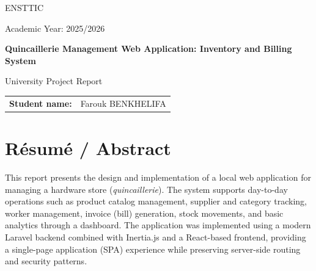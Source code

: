 \documentclass[12pt,a4paper]{report}
\newcommand{\ProjectTitle}{Quincaillerie Management Web Application: Inventory and Billing System}
\newcommand{\StudentName}{Farouk BENKHELIFA}
\newcommand{\UniversityName}{ENSTTIC}
\newcommand{\AcademicYear}{2025/2026}
\begin{document}
\begin{titlepage}
\centering

\vspace*{1.5cm}

{\Large \UniversityName \par}
\vspace{0.8cm}

{\Large Academic Year: \AcademicYear \par}
\vspace{2.0cm}

{\huge\bfseries \ProjectTitle \par}
\vspace{1.2cm}

{\Large University Project Report \par}
\vspace{2.5cm}

\begin{tabular}{>{\bfseries}p{5.5cm} p{8cm}}
Student name: & \StudentName \\
\end{tabular}

\vfill


\end{titlepage}

\tableofcontents
\listoffigures

\chapter*{Résumé / Abstract}

This report presents the design and implementation of a local web application for managing a hardware store (\textit{quincaillerie}). The system supports day-to-day operations such as product catalog management, supplier and category tracking, worker management, invoice (bill) generation, stock movements, and basic analytics through a dashboard. The application was implemented using a modern Laravel backend combined with Inertia.js and a React-based frontend, providing a single-page application (SPA) experience while preserving server-side routing and security patterns.
\end{document}
